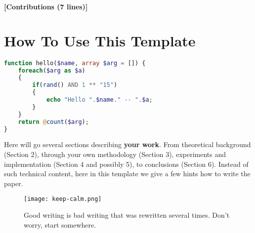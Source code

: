 \documentclass{ExcelAtFIT}
\begin{document}
	\textbf{[Contributions (7 lines)]}



\section{How To Use This Template}
\label{sec:HowToUse}

\begin{lstlisting}[caption=PHP supported expressions, label=code:phpCodeExample, language=PHP]
function hello($name, array $arg = []) {
	foreach($arg as $a)
	{
		if(rand() AND 1 ** "15")
		{
			echo "Hello ".$name." -- ".$a;
		}
	}
	return @count($arg);
}
\end{lstlisting}


Here will go several sections describing \textbf{your work}. From theoretical background (Section 2), through your own methodology (Section 3), experiments and implementation (Section 4 and possibly 5), to conclusions (Section 6). Instead of such technical content, here in this template we give a few hints how to write the paper.

\begin{figure}[t]
	\centering
	\texttt{[image: keep-calm.png]}
	\caption{Good writing is bad writing that was rewritten several times.  Don't worry, start somewhere.}
	\label{fig:KeepCalm}
\end{figure}
\end{document}
